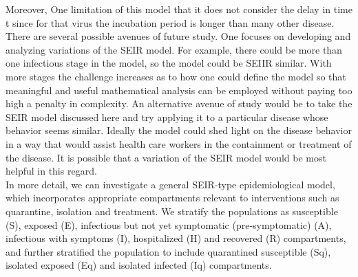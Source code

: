 \documentclass{exam}
\begin{document}
Moreover, One limitation of this model that it does not consider the delay in time t since for that virus the incubation period is longer than many other disease.\\
There are several possible avenues of future study. One focuses on developing and analyzing variations of the SEIR model. For example, there could be more than one infectious stage in the model, so the model could be SEIIR  similar. With more stages the challenge increases as to how one could define the model so that meaningful and useful mathematical analysis can be employed without paying too high a penalty in complexity. An alternative avenue of study would be to take the SEIR model discussed here and try applying it to a particular disease whose behavior seems similar. Ideally the model could shed light on the disease behavior in a way that would assist health care workers in the containment or treatment of the disease. It is possible that a variation of the SEIR model would be most helpful in this regard.\\

In more detail, we can investigate a general SEIR‐type epidemiological model, which incorporates
appropriate compartments relevant to interventions such as quarantine, isolation and treatment. We
stratify the populations as susceptible (S), exposed (E), infectious but not yet symptomatic
(pre‐symptomatic) (A), infectious with symptoms (I), hospitalized (H) and recovered (R)
compartments, and further stratified the population to include quarantined susceptible (Sq), isolated exposed (Eq) and isolated infected (Iq) compartments. 
\end{document}
